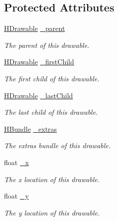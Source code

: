 \subsection*{Protected Attributes}
\begin{DoxyCompactItemize}
\item 
\hyperlink{classhype_1_1core_1_1drawable_1_1_h_drawable}{H\-Drawable} \hyperlink{classhype_1_1core_1_1drawable_1_1_h_drawable_ad612d5e1d96467275eeb8163b9da4b8f}{\-\_\-parent}
\begin{DoxyCompactList}\small\item\em The parent of this drawable. \end{DoxyCompactList}\item 
\hyperlink{classhype_1_1core_1_1drawable_1_1_h_drawable}{H\-Drawable} \hyperlink{classhype_1_1core_1_1drawable_1_1_h_drawable_ae09b30df6ce561c6e7d5dd4ca43ebd41}{\-\_\-first\-Child}
\begin{DoxyCompactList}\small\item\em The first child of this drawable. \end{DoxyCompactList}\item 
\hyperlink{classhype_1_1core_1_1drawable_1_1_h_drawable}{H\-Drawable} \hyperlink{classhype_1_1core_1_1drawable_1_1_h_drawable_aefc226e22c24a1a73e55d8a793e802f9}{\-\_\-last\-Child}
\begin{DoxyCompactList}\small\item\em The last child of this drawable. \end{DoxyCompactList}\item 
\hyperlink{classhype_1_1core_1_1util_1_1_h_bundle}{H\-Bundle} \hyperlink{classhype_1_1core_1_1drawable_1_1_h_drawable_a1a8ae31b67c5adc319cd8108b16171fe}{\-\_\-extras}
\begin{DoxyCompactList}\small\item\em The extras bundle of this drawable. \end{DoxyCompactList}\item 
float \hyperlink{classhype_1_1core_1_1drawable_1_1_h_drawable_a29a7e29632bdd992ca49c5542ba3cc88}{\-\_\-x}
\begin{DoxyCompactList}\small\item\em The x location of this drawable. \end{DoxyCompactList}\item 
float \hyperlink{classhype_1_1core_1_1drawable_1_1_h_drawable_a449159180f9b00f522d9f70226c31302}{\-\_\-y}
\begin{DoxyCompactList}\small\item\em The y location of this drawable. \end{DoxyCompactList}\item 

\end{DoxyCompactItemize}
